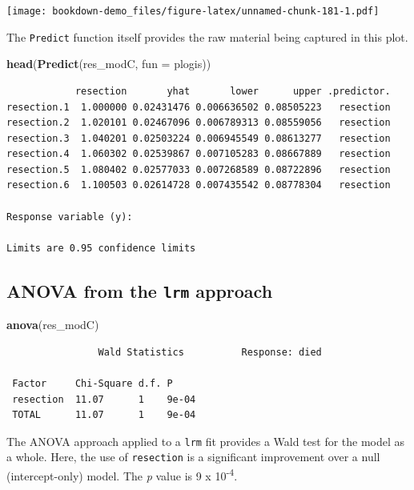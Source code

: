 \documentclass[]{book}
\newenvironment{Shaded}{\begin{snugshade}}{\end{snugshade}}
\newcommand{\KeywordTok}[1]{\textcolor[rgb]{0.13,0.29,0.53}{\textbf{#1}}}
\newcommand{\DataTypeTok}[1]{\textcolor[rgb]{0.13,0.29,0.53}{#1}}
\newcommand{\NormalTok}[1]{#1}
\theoremstyle{definition}
\theoremstyle{definition}
\theoremstyle{definition}
\theoremstyle{remark}
\begin{document}
\texttt{[image: bookdown-demo\_files/figure-latex/unnamed-chunk-181-1.pdf]}

The \texttt{Predict} function itself provides the raw material being
captured in this plot.

\begin{Shaded}
\begin{Highlighting}[]
\KeywordTok{head}\NormalTok{(}\KeywordTok{Predict}\NormalTok{(res_modC, }\DataTypeTok{fun =}\NormalTok{ plogis))}
\end{Highlighting}
\end{Shaded}

\begin{verbatim}
            resection       yhat       lower      upper .predictor.
resection.1  1.000000 0.02431476 0.006636502 0.08505223   resection
resection.2  1.020101 0.02467096 0.006789313 0.08559056   resection
resection.3  1.040201 0.02503224 0.006945549 0.08613277   resection
resection.4  1.060302 0.02539867 0.007105283 0.08667889   resection
resection.5  1.080402 0.02577033 0.007268589 0.08722896   resection
resection.6  1.100503 0.02614728 0.007435542 0.08778304   resection

Response variable (y):  

Limits are 0.95 confidence limits
\end{verbatim}

\subsection{\texorpdfstring{ANOVA from the \texttt{lrm}
approach}{ANOVA from the lrm approach}}\label{anova-from-the-lrm-approach}

\begin{Shaded}
\begin{Highlighting}[]
\KeywordTok{anova}\NormalTok{(res_modC)}
\end{Highlighting}
\end{Shaded}

\begin{verbatim}
                Wald Statistics          Response: died 

 Factor     Chi-Square d.f. P    
 resection  11.07      1    9e-04
 TOTAL      11.07      1    9e-04
\end{verbatim}

The ANOVA approach applied to a \texttt{lrm} fit provides a Wald test
for the model as a whole. Here, the use of \texttt{resection} is a
significant improvement over a null (intercept-only) model. The \emph{p}
value is 9 x 10\textsuperscript{-4}.
\end{document}
